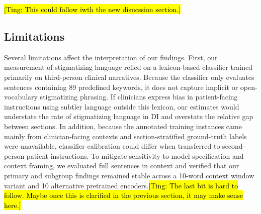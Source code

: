\documentclass[unnumsec,webpdf,contemporary,large]{oup-authoring-template}
\newcommand{\td}[1]{\sethlcolor{pink}\hl{[Ting: #1]}}
\begin{document}

\td{This could follow iwth the new disucssion section.}
\subsection{Limitations}
Several limitations affect the interpretation of our findings. First, our measurement of stigmatizing language relied on a lexicon-based classifier trained primarily on third-person clinical narratives. Because the classifier only evaluates sentences containing 89 predefined keywords, it does not capture implicit or open-vocabulary stigmatizing phrasing. If clinicians express bias in patient-facing instructions using subtler language outside this lexicon, our estimates would understate the rate of stigmatizing language in DI and overstate the relative gap between sections. In addition, because the annotated training instances came mainly from clinician-facing contexts and section-stratified ground-truth labels were unavailable, classifier calibration could differ when transferred to second-person patient instructions. To mitigate sensitivity to model specification and context framing, we evaluated full sentences in context and verified that our primary and subgroup findings remained stable across a 10-word context window variant and 10 alternative pretrained encoders.\td{The last bit is hard to follow. Maybe once this is clarified in the previous section, it may make sense here.}
\end{document}
